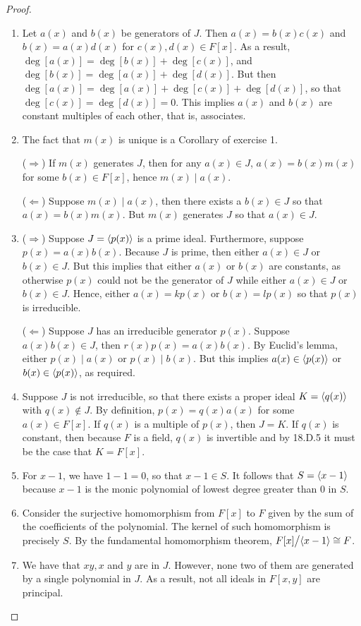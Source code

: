 \begin{proof}
 \begin{enumerate}
    \item Let $a(x)$ and $b(x)$ be generators of $J$. Then $a(x)=b(x)c(x)$ and $b(x)=a(x)d(x)$ for $c(x),d(x)\in F[x]$. As a result, $\deg[a(x)]=\deg[b(x)]+\deg[c(x)]$, and $\deg[b(x)]=\deg[a(x)]+\deg[d(x)]$. But then $\deg[a(x)]=\deg[a(x)]+\deg[c(x)]+\deg[d(x)]$, so that $\deg[c(x)]=\deg[d(x)]=0$. This implies $a(x)$ and $b(x)$ are constant multiples of each other, that is, associates.
    \item The fact that $m(x)$ is unique is a Corollary of exercise 1.

    ($\Rightarrow$) If $m(x)$ generates $J$, then for any $a(x)\in J$, $a(x)=b(x)m(x)$ for some $b(x)\in F[x]$, hence $m(x)\mid a(x)$.

    ($\Leftarrow$) Suppose $m(x)\mid a(x)$, then there exists a $b(x)\in J$ so that $a(x)=b(x)m(x)$. But $m(x)$ generates $J$ so that $a(x)\in J$.
    \item ($\Rightarrow$) Suppose $J=\left\langle p(x)\right\rangle$ is a prime ideal. Furthermore, suppose $p(x)=a(x)b(x)$. Because $J$ is prime, then either $a(x)\in J$ or $b(x)\in J$. But this implies that either $a(x)$ or $b(x)$ are constants, as otherwise $p(x)$ could not be the generator of $J$ while either $a(x)\in J$ or $b(x)\in J$. Hence, either $a(x)=kp(x)$ or $b(x)=lp(x)$ so that $p(x)$ is irreducible. 

    ($\Leftarrow$) Suppose $J$ has an irreducible generator $p(x)$. Suppose $a(x)b(x)\in J$, then $r(x)p(x)=a(x)b(x)$. By Euclid's lemma, either $p(x)\mid a(x)$ or $p(x)\mid b(x)$. But this implies $a(x)\in\left\langle p(x)\right\rangle$ or $b(x)\in\left\langle p(x)\right\rangle$, as required.
    \item Suppose $J$ is not irreducible, so that there exists a proper ideal $K=\left\langle q(x)\right\rangle$ with $q(x)\notin J$. By definition, $p(x)=q(x)a(x)$ for some $a(x)\in F[x]$. If $q(x)$ is a multiple of $p(x)$, then $J=K$. If $q(x)$ is constant, then because $F$ is a field, $q(x)$ is invertible and by 18.D.5 it must be the case that $K=F[x]$.
    \item For $x-1$, we have $1-1=0$, so that $x-1\in S$. It follows that $S=\left\langle x-1\right\rangle$ because $x-1$ is the monic polynomial of lowest degree greater than 0 in $S$.
    \item Consider the surjective homomorphism from $F[x]$ to $F$ given by the sum of the coefficients of the polynomial. The kernel of such homomorphism is precisely $S$. By the fundamental homomorphism theorem, ${\textstyle F[x]}\big/{\textstyle \left\langle x-1\right\rangle}\cong F$.
    \item We have that $xy,x$ and $y$ are in $J$. However, none two of them are generated by a single polynomial in $J$. As a result, not all ideals in $F[x,y]$ are principal.
 \end{enumerate}
\end{proof}


